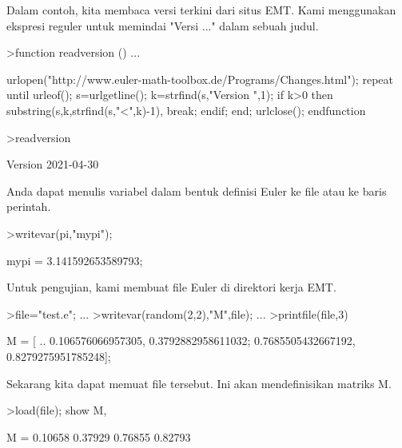 \documentclass[a4paper,10pt]{article}
\begin{document}
\begin{eulernotebook}
\begin{eulercomment}
\begin{eulercomment}
\begin{eulercomment}
Dalam contoh, kita membaca versi terkini dari situs EMT. Kami
menggunakan ekspresi reguler untuk memindai "Versi ..." dalam sebuah
judul.
\end{eulercomment}
\begin{eulerprompt}
>function readversion () ...
\end{eulerprompt}
\begin{eulerudf}
  urlopen("http://www.euler-math-toolbox.de/Programs/Changes.html");
  repeat
    until urleof();
    s=urlgetline();
    k=strfind(s,"Version ",1);
    if k>0 then substring(s,k,strfind(s,"<",k)-1), break; endif;
  end;
  urlclose();
  endfunction
\end{eulerudf}
\begin{eulerprompt}
>readversion
\end{eulerprompt}
\begin{euleroutput}
  Version 2021-04-30
\end{euleroutput}
\begin{eulercomment}
Anda dapat menulis variabel dalam bentuk definisi Euler ke file atau
ke baris perintah.
\end{eulercomment}
\begin{eulerprompt}
>writevar(pi,"mypi");
\end{eulerprompt}
\begin{euleroutput}
  mypi = 3.141592653589793;
\end{euleroutput}
\begin{eulercomment}
Untuk pengujian, kami membuat file Euler di direktori kerja EMT.
\end{eulercomment}
\begin{eulerprompt}
>file="test.e"; ...
>writevar(random(2,2),"M",file); ...
>printfile(file,3)
\end{eulerprompt}
\begin{euleroutput}
  M = [ ..
  0.106576066957305, 0.3792882958611032;
  0.7685505432667192, 0.8279275951785248];
\end{euleroutput}
\begin{eulercomment}
Sekarang kita dapat memuat file tersebut. Ini akan mendefinisikan
matriks M.
\end{eulercomment}
\begin{eulerprompt}
>load(file); show M,
\end{eulerprompt}
\begin{euleroutput}
  M = 
    0.10658   0.37929 
    0.76855   0.82793 
\end{euleroutput}

\end{eulercomment}
\end{eulercomment}
\end{eulernotebook}
\end{document}
